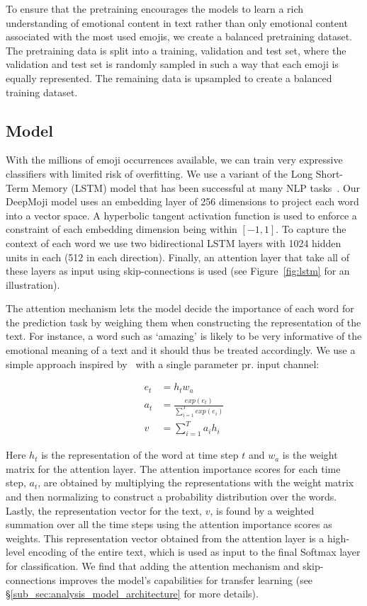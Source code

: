 \documentclass[11pt,a4paper]{article}
\begin{document}
To ensure that the pretraining encourages the models to learn a rich understanding of emotional content in text rather than only emotional content associated with the most used emojis, we create a balanced pretraining dataset. The pretraining data is split into a training, validation and test set, where the validation and test set is randomly sampled in such a way that each emoji is equally represented. The remaining data is upsampled to create a balanced training dataset.

\subsection{Model}
\label{sub_sec:model}

With the millions of emoji occurrences available, we can train very expressive classifiers with limited risk of overfitting. We use a variant of the Long Short-Term Memory (LSTM) model that has been successful at many NLP tasks~\cite{hochreiter1997long, sutskever2014sequence}. Our DeepMoji model uses an embedding layer of 256 dimensions to project each word into a vector space. A hyperbolic tangent activation function is used to enforce a constraint of each embedding dimension being within $[-1, 1]$. To capture the context of each word we use two bidirectional LSTM layers with 1024 hidden units in each (512 in each direction). Finally, an attention layer that take all of these layers as input using skip-connections is used (see Figure~\ref{fig:lstm} for an illustration).

The attention mechanism lets the model decide the importance of each word for the prediction task by weighing them when constructing the representation of the text. For instance, a word such as `amazing' is likely to be very informative of the emotional meaning of a text and it should thus be treated accordingly. We use a simple approach inspired by~\cite{bahdanau2014neural, yang2016hierarchical} with a single parameter pr. input channel:

\begin{align*}
e_t &= h_t w_a\\
a_t &= \frac{exp(e_t)}{\sum_{i=1}^{T}{exp(e_i)}}\\
v &= \sum_{i=1}^{T}{a_i h_i}
\end{align*}

Here $h_t$ is the representation of the word at time step $t$ and $w_a$ is the weight matrix for the attention layer. The attention importance scores for each time step, $a_t$, are obtained by multiplying the representations with the weight matrix and then normalizing to construct a probability distribution over the words. Lastly, the representation vector for the text, $v$, is found by a weighted summation over all the time steps using the attention importance scores as weights. This representation vector obtained from the attention layer is a high-level encoding of the entire text, which is used as input to the final Softmax layer for classification. We find that adding the attention mechanism and skip-connections improves the model's capabilities for transfer learning (see \S\ref{sub_sec:analysis_model_architecture} for more details). 
\end{document}
